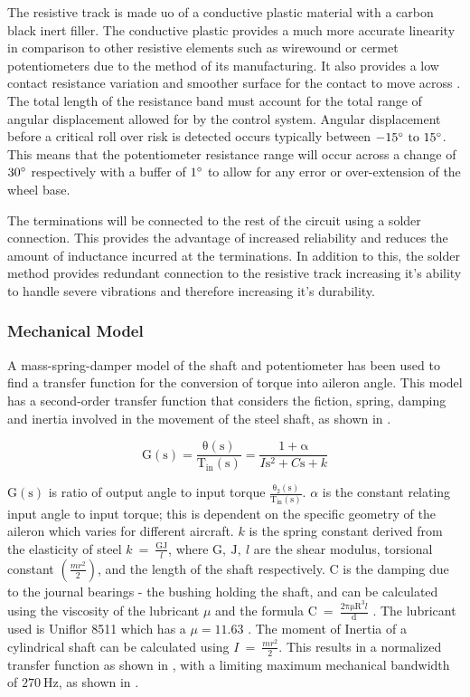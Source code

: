 \documentclass[10pt,twocolumn]{witseiepaper}
\begin{document}
The resistive track is made uo of a conductive plastic material with a carbon black inert filler. The conductive plastic provides a much more accurate linearity in comparison to other resistive elements such as wirewound or cermet potentiometers due to the method of its manufacturing. It also provides a low contact resistance variation and smoother surface for the contact to move across \cite{handbook}. The total length of the resistance band must account for the total range of angular displacement allowed for by the control system. Angular displacement before a critical roll over risk is detected occurs typically between $-15 ^\circ \mathrm{~to~} 15 ^\circ $. This means that the potentiometer resistance range will occur across a change of $ 30 ^\circ$ respectively with a buffer of $1 ^\circ $ to allow for any error or over-extension of the wheel base. 

The terminations will be connected to the rest of the circuit using a solder connection. This provides the advantage of increased reliability and reduces the amount of inductance incurred at the terminations. In addition to this, the solder method provides redundant connection to the resistive track increasing it's ability to handle severe vibrations and therefore increasing it's durability.
 
\subsubsection{Mechanical Model}

A mass-spring-damper model of the shaft and potentiometer has been used to find a transfer function for the conversion of torque into aileron angle. This model has a second-order transfer function that considers the fiction, spring, damping and inertia involved in the movement of the steel shaft, as shown in .

\begin{equation}
\mathrm{G(s) = \frac{\theta(s)}{T_{in}(s)} = \frac{1 + \alpha}{\textit{I}s^2 + \textit{C}s + \textit{k}} }
\label{mech_model}
\end{equation}

$\mathrm{G(s)}$ is ratio of output angle to input torque $\mathrm{\frac{\theta_2(s)}{T_{in}(s)}}$. $\alpha$ is the constant relating input angle to input torque; this is dependent on the specific geometry of the aileron which varies for different aircraft. $k$ is the spring constant derived from the elasticity of steel $k\mathrm{~=~\frac{GJ}{\textit{l}}}$, where $\mathrm{G,~J,~\textit{l}}$ are the shear modulus, torsional constant $(\frac{mr^2}{2})$, and the length of the shaft respectively. $\mathrm{C}$ is the damping due to the journal bearings - the bushing holding the shaft, and can be calculated using the viscosity of the lubricant $\mu$ and the formula $\mathrm{C~=~\frac{2\pi\mu R^3 \textit{l}}{d}}$ \cite{vibrations}. The lubricant used is Uniflor 8511 which has a $\mu = 11.63$ \cite{uniflor}. The moment of Inertia of a cylindrical shaft can be calculated using $I~=~\frac{mr^2}{2}$. This results in a normalized transfer function as shown in , with a limiting maximum mechanical bandwidth of $270~\mathrm{Hz}$, as shown in .
\end{document}
